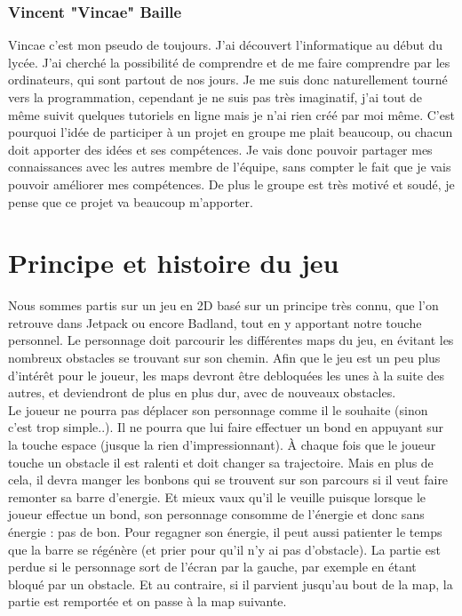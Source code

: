 \documentclass [11pt]{report}
\begin{document}
		\subsection{Vincent "Vincae" Baille}
			Vincae c'est mon pseudo de toujours. J'ai découvert l'informatique au début du lycée. J'ai cherché la possibilité de comprendre et de me faire comprendre par les ordinateurs, qui sont partout de nos jours. Je me suis donc naturellement tourné vers la programmation, cependant je ne suis pas très imaginatif, j'ai tout de même suivit quelques tutoriels en ligne mais je n'ai rien créé par moi même. C'est pourquoi l'idée de participer à un projet en groupe me plait beaucoup, ou chacun doit apporter des idées et ses compétences. Je vais donc pouvoir partager mes connaissances avec les autres membre de l'équipe, sans compter le fait que je vais pouvoir améliorer mes compétences. De plus le groupe est très motivé et soudé, je pense que ce projet va beaucoup m'apporter.

\chapter{Principe et histoire du jeu}

		\indent Nous sommes partis sur un jeu en 2D bas\'e sur un principe tr\`es connu, que l'on retrouve dans Jetpack ou encore Badland, tout en y apportant notre touche personnel. Le personnage doit parcourir les différentes maps du jeu, en évitant les nombreux obstacles se trouvant sur son chemin. Afin que le jeu est un peu plus 		d'intérêt pour le joueur, les maps devront être debloquées les unes à la suite des autres, et deviendront de plus en plus dur, avec de nouveaux obstacles.\\

		\indent Le joueur ne pourra pas déplacer son personnage comme il le souhaite (sinon c'est trop simple..). Il ne pourra que lui faire effectuer un bond en appuyant sur la touche espace (jusque la rien d'impressionnant). \`A chaque fois que le joueur touche un obstacle il est ralenti et doit changer sa trajectoire. Mais en plus de cela, il 	devra manger les bonbons qui se trouvent sur son parcours si il veut faire remonter sa barre d'energie. Et mieux vaux qu'il le veuille puisque lorsque le joueur effectue un bond, son personnage consomme de l'énergie et donc sans énergie : pas de bon. Pour regagner son énergie, il peut aussi patienter le temps que la barre se régénère 		(et prier pour qu'il n'y ai pas d'obstacle). La partie est perdue si le personnage sort de l'écran par la gauche, par exemple en étant bloqué par un obstacle. Et au contraire, si il parvient jusqu'au bout de la map, la partie est remportée et on passe à la map suivante.
\end{document}
